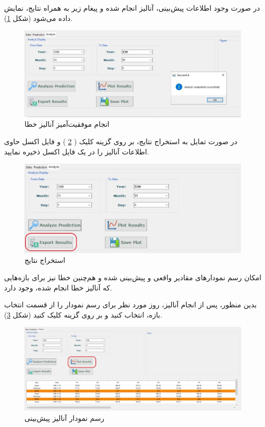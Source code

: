 \documentclass[a4paper,20pt,dvipsnames, usenames]{extbook}
\begin{document}
در صورت وجود اطلاعات پیش‌بینی، آنالیز انجام شده و پیغام زیر به همراه نتایج، نمایش داده می‌شود (شکل
\ref{fig35}).

\begin{figure}[!h]
	\centering
	\includegraphics[width = \textwidth]{fig31}
	\caption{انجام موفقیت‌آمیز آنالیز خطا}
	\label{fig35}
\end{figure}

در صورت تمایل به استخراج نتایج، بر روی گزینه 
کلیک (
\ref{fig36}
) و فایل اکسل حاوی اطلاعات آنالیز را در یک فایل اکسل ذخیره نمایید.

\begin{figure}[!h]
	\centering
	\includegraphics[width = \textwidth]{fig32}
	\caption{استخراج نتایج}
	\label{fig36}
\end{figure}
امکان رسم نمودارهای مقادیر واقعی و پیش‌بینی شده و هم‌چنین خطا نیز برای بازه‌هایی که آنالیز خطا انجام شده، ‌وجود دارد.

بدین منظور، پس از انجام آنالیز، روز مورد نظر برای رسم نمودار را از قسمت انتخاب بازه، انتخاب کنید و بر روی گزینه
کلیک کنید (شکل
\ref{fig37}). 

\begin{figure}[!h]
	\centering
	\includegraphics[width = \textwidth]{fig33}
	\caption{رسم نمودار آنالیز پیش‌بینی}
	\label{fig37}
\end{figure}
\end{document}
